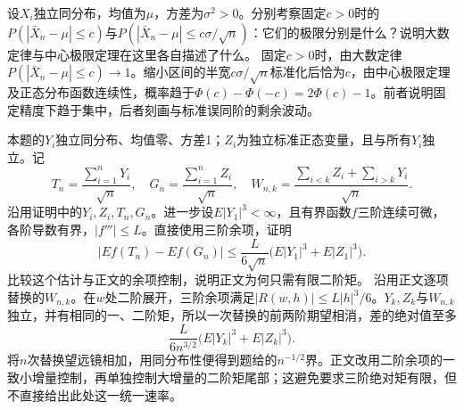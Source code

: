 设\(X_i\)独立同分布，均值为\(\mu\)，方差为\(\sigma^2>0\)。分别考察固定\(c>0\)时的\(P(|\bar X_n-\mu|\le c)\)与\(P(|\bar X_n-\mu|\le c\sigma/\sqrt n)\)：它们的极限分别是什么？说明大数定律与中心极限定理在这里各自描述了什么。
\solutionanswer
固定\(c>0\)时，由大数定律\(P(|\bar X_n-\mu|\le c)\to1\)。缩小区间的半宽\(c\sigma/\sqrt n\)标准化后恰为\(c\)，由中心极限定理及正态分布函数连续性，概率趋于\(\Phi(c)-\Phi(-c)=2\Phi(c)-1\)。前者说明固定精度下趋于集中，后者刻画与标准误同阶的剩余波动。


本题的\(Y_i\)独立同分布、均值零、方差1；\(Z_i\)为独立标准正态变量，且与所有\(Y_i\)独立。记
\[
 T_n=\frac{\sum_{i=1}^nY_i}{\sqrt n},\quad G_n=\frac{\sum_{i=1}^nZ_i}{\sqrt n},\quad
 W_{n,k}=\frac{\sum_{i<k}Z_i+\sum_{i>k}Y_i}{\sqrt n}.
\]
沿用证明中的\(Y_i,Z_i,T_n,G_n\)。进一步设\(E|Y_1|^3<\infty\)，且有界函数\(f\)三阶连续可微，各阶导数有界，\(|f'''|\le L\)。直接使用三阶余项，证明
\[
 |Ef(T_n)-Ef(G_n)|\le
 \frac{L}{6\sqrt n}\bigl(E|Y_1|^3+E|Z_1|^3\bigr).
\]
比较这个估计与正文的余项控制，说明正文为何只需有限二阶矩。
\solutionanswer
沿用正文逐项替换的\(W_{n,k}\)。在\(w\)处二阶展开，三阶余项满足\(|R(w,h)|\le L|h|^3/6\)。\(Y_k,Z_k\)与\(W_{n,k}\)独立，并有相同的一、二阶矩，所以一次替换的前两阶期望相消，差的绝对值至多
\[
 \frac{L}{6n^{3/2}}\bigl(E|Y_k|^3+E|Z_k|^3\bigr).
\]
将\(n\)次替换望远镜相加，用同分布性便得到题给的\(n^{-1/2}\)界。正文改用二阶余项的一致小增量控制，再单独控制大增量的二阶矩尾部；这避免要求三阶绝对矩有限，但不直接给出此处这一统一速率。
\par
